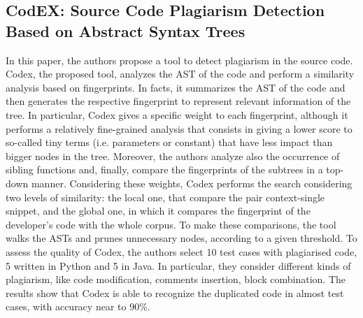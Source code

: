 \subsection{CodEX: Source Code Plagiarism Detection Based on Abstract Syntax Trees}
In this paper, the authors propose a tool to detect plagiarism in the source code. Codex, the proposed tool, analyzes the AST of the code and perform a similarity analysis based on fingerprints. In facts, it summarizes the AST of the code and then generates the respective fingerprint to represent relevant information of the tree. In particular, Codex gives a specific weight to each fingerprint, although it performs a relatively fine-grained analysis that consists in giving a lower score to so-called tiny terms (i.e. parameters or constant) that have less impact than bigger nodes in the tree. Moreover, the authors analyze also the occurrence of sibling functions and, finally, compare the fingerprints of the subtrees in a top-down manner. Considering these weights, Codex performs the search considering two levels of similarity: the local one, that compare the pair context-single snippet, and the global one, in which it compares the fingerprint of the developer's code with the whole corpus. To make these comparisons, the tool walks the ASTs and prunes unnecessary nodes, according to a given threshold. To assess the quality of Codex, the authors select 10 test cases with plagiarised code, 5 written in Python and 5 in Java. In particular, they consider different kinds of plagiarism, like code modification, comments insertion, block combination. The results show that Codex is able to recognize the duplicated code in almost test cases, with accuracy near to 90\%.

